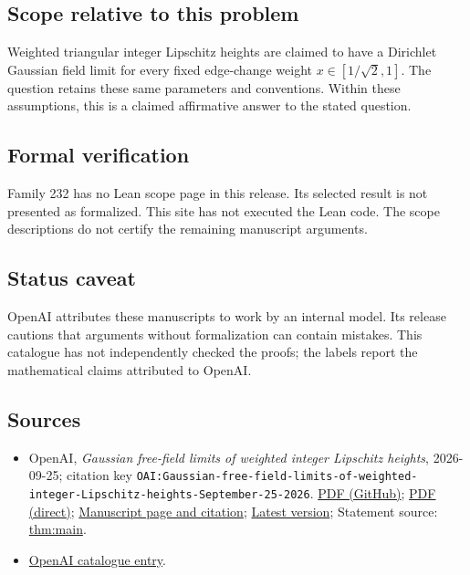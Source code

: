 \documentclass[11pt]{article}
\begin{document}
\subsection{Scope relative to this problem}
Weighted triangular integer Lipschitz heights are claimed to have a Dirichlet Gaussian field limit for every fixed edge-change weight $x\in[1/\sqrt2,1]$. The question retains these same parameters and conventions. Within these assumptions, this is a claimed affirmative answer to the stated question.

\subsection{Formal verification}
Family 232 has no Lean scope page in this release. Its selected result is not presented as formalized. This site has not executed the Lean code. The scope descriptions do not certify the remaining manuscript arguments.

\subsection{Status caveat}
OpenAI attributes these manuscripts to work by an internal model. Its release cautions that arguments without formalization can contain mistakes. This catalogue has not independently checked the proofs; the labels report the mathematical claims attributed to OpenAI.

\subsection{Sources}
\begin{itemize}
\item OpenAI, \emph{Gaussian free-field limits of weighted integer Lipschitz heights}, 2026-09-25; citation key \texttt{OAI:Gaussian-free-field-limits-of-weighted-integer-Lipschitz-heights-September-25-2026}. \href{https://github.com/openai/math/blob/adc7f1241b42e322a6451854ab7e4b4c146bf78a/preprints/Gaussian-free-field-limits-of-weighted-integer-Lipschitz-heights-September-25-2026/paper.pdf}{PDF (GitHub)}; \href{https://github.com/openai/math/raw/adc7f1241b42e322a6451854ab7e4b4c146bf78a/preprints/Gaussian-free-field-limits-of-weighted-integer-Lipschitz-heights-September-25-2026/paper.pdf}{PDF (direct)}; \href{https://github.com/openai/math/blob/adc7f1241b42e322a6451854ab7e4b4c146bf78a/preprints/Gaussian-free-field-limits-of-weighted-integer-Lipschitz-heights-September-25-2026/README.md}{Manuscript page and citation}; \href{https://github.com/openai/math/blob/main/preprints/Gaussian-free-field-limits-of-weighted-integer-Lipschitz-heights-September-25-2026/paper.pdf}{Latest version}; Statement source: \href{https://github.com/openai/math/blob/adc7f1241b42e322a6451854ab7e4b4c146bf78a/preprints/Gaussian-free-field-limits-of-weighted-integer-Lipschitz-heights-September-25-2026/build/sections/01-introduction.tex\#L78}{thm:main}.
\item \href{https://github.com/openai/math/blob/adc7f1241b42e322a6451854ab7e4b4c146bf78a/CONTENTS.md}{OpenAI catalogue entry}.
\end{itemize}
\end{document}
